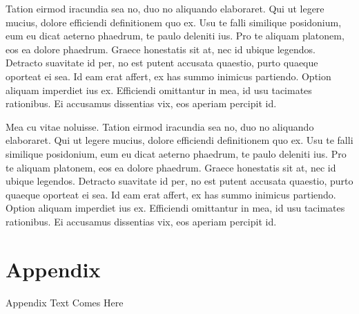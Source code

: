 Tation eirmod iracundia sea no, duo no aliquando elaboraret. Qui ut legere mucius, dolore efficiendi definitionem quo ex. Usu te falli similique posidonium, eum eu dicat aeterno phaedrum, te paulo deleniti ius. Pro te aliquam platonem, eos ea dolore phaedrum. Graece honestatis sit at, nec id ubique legendos.
Detracto suavitate id per, no est putent accusata quaestio, purto quaeque oporteat ei sea. Id eam erat affert, ex has summo inimicus partiendo. Option aliquam imperdiet ius ex. Efficiendi omittantur in mea, id usu tacimates rationibus. Ei accusamus dissentias vix, eos aperiam percipit id.

Mea cu vitae noluisse. Tation eirmod iracundia sea no, duo no aliquando elaboraret. Qui ut legere mucius, dolore efficiendi definitionem quo ex. Usu te falli similique posidonium, eum eu dicat aeterno phaedrum, te paulo deleniti ius. Pro te aliquam platonem, eos ea dolore phaedrum. Graece honestatis sit at, nec id ubique legendos.
Detracto suavitate id per, no est putent accusata quaestio, purto quaeque oporteat ei sea. Id eam erat affert, ex has summo inimicus partiendo. Option aliquam imperdiet ius ex. Efficiendi omittantur in mea, id usu tacimates rationibus. Ei accusamus dissentias vix, eos aperiam percipit id.

\renewcommand\bibname{References} %

\chapter*{Appendix}
Appendix Text Comes Here


